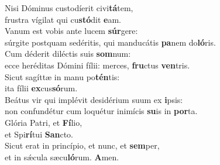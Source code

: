 \evenverse Nisi Dóminus custodíerit civi\textbf{tá}tem,~\*\\
\evenverse frustra vígilat qui cu\textbf{stó}dit \textbf{e}am.\\
\oddverse Vanum est vobis ante lucem \textbf{súr}gere:~\*\\
\oddverse súrgite postquam sedéritis, qui manducátis \textbf{pa}nem do\textbf{ló}ris.\\
\evenverse Cum déderit diléctis suis \textbf{som}num:~\*\\
\evenverse ecce heréditas Dómini fílii: merces, \textbf{fru}ctus \textbf{ven}tris.\\
\oddverse Sicut sagíttæ in manu po\textbf{tén}tis:~\*\\
\oddverse ita fílii \textbf{ex}cus\textbf{só}rum.\\
\evenverse Beátus vir qui implévit desidérium suum ex \textbf{i}psis:~\*\\
\evenverse non confundétur cum loquétur inimícis \textbf{su}is in \textbf{por}ta.\\
\oddverse Glória Patri, et \textbf{Fí}lio,~\*\\
\oddverse et Spi\textbf{rí}tui \textbf{San}cto.\\
\evenverse Sicut erat in princípio, et nunc, et \textbf{sem}per,~\*\\
\evenverse et in sǽcula sæcu\textbf{ló}rum. \textbf{A}men.\\
